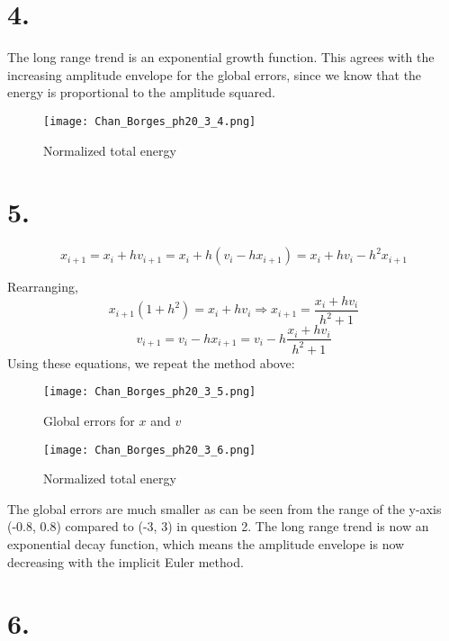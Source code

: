 \documentclass[12pt]{article}
\begin{document}
\section*{4.}
The long range trend is an exponential growth function. This agrees with the increasing amplitude envelope for the global errors, since we know that the energy is proportional to the amplitude squared.
\begin{figure}[h]
\texttt{[image: Chan\_Borges\_ph20\_3\_4.png]}
\centering
\caption{Normalized total energy}
\end{figure}

\section*{5.}
\begin{equation} 
x_{i+1} = x_i + h v_{i+1} = x_i + h(v_i - h x_{i+1}) = x_i + h v_i - h^2 x_{i+1}
\end{equation}

Rearranging, 
\begin{equation} 
x_{i+1} (1 + h^2) = x_i + hv_i \Longrightarrow x_{i+1} = \frac{x_i + hv_i}{h^2 + 1}
\end{equation}
\begin{equation} 
v_{i+1} = v_i - h x_{i+1} = v_i - h \frac{x_i + hv_i}{h^2 + 1}
\end{equation}
Using these equations, we repeat the method above: 
\begin{figure}[h]
  \centering
  \begin{minipage}[b]{0.47\textwidth}
    \texttt{[image: Chan\_Borges\_ph20\_3\_5.png]}
    \caption{Global errors for $x$ and $v$}
  \end{minipage}
  \hfill
  \begin{minipage}[b]{0.47\textwidth}
    \texttt{[image: Chan\_Borges\_ph20\_3\_6.png]}
    \caption{Normalized total energy}
  \end{minipage}
\end{figure}

\noindent The global errors are much smaller as can be seen from the range of the y-axis (-0.8, 0.8) compared to (-3, 3) in question 2.
The long range trend is now an exponential decay function, which means the amplitude envelope is now decreasing with the implicit Euler method. 

\newpage

\section*{6.}
\end{document}
